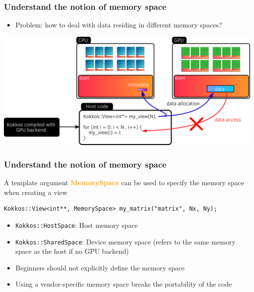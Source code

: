 \documentclass[aspectratio=169]{beamer}
\newcommand{\highlight}[1]{\textcolor{orange}{\textbf{#1}}}
\begin{document}
\begin{frame}[fragile]
    \frametitle{Understand the notion of memory space}

\begin{itemize}
    \item Problem: how to deal with data residing in different memory spaces?
\end{itemize}

\begin{center}
    \includegraphics[width=\textwidth]{../../images/device_memory_access.png}
\end{center}

\end{frame}


\begin{frame}[fragile]
    \frametitle{Understand the notion of memory space}

A template argument \highlight{MemorySpace} can be used to specify the memory space when creating a view

\begin{verbatim}
Kokkos::View<int**, MemorySpace> my_matrix("matrix", Nx, Ny);
\end{verbatim}

\begin{itemize}
    \item \texttt{Kokkos::HostSpace}: Host memory space
    \item \texttt{Kokkos::SharedSpace}: Device memory space (refers to the same memory space as the host if no GPU backend)
\end{itemize}

\begin{alertblock}{}
    \begin{itemize}
    \item Beginners should not explicitly define the memory space
    \item Using a vendor-specific memory space breaks the portability of the code
    \end{itemize}
\end{alertblock}

\end{frame}
\end{document}
